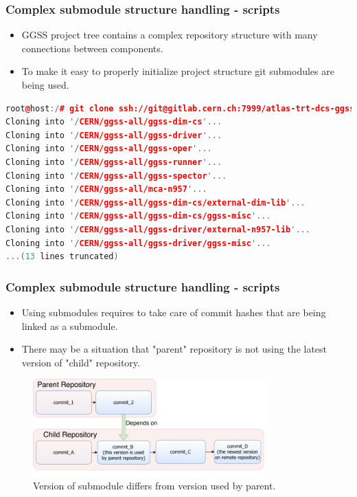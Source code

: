 \documentclass[10pt]{beamer}
\begin{document}
\begin{frame}[fragile]
\frametitle{Complex submodule structure handling - scripts}
\begin{itemize}
\item GGSS project tree contains a complex repository structure with many connections between components.
\item To make it easy to properly initialize project structure git submodules are being used.
\end{itemize}
\begin{lstlisting}[language=c++, caption={Initialize project structure with one command.}]
root@host:/# git clone ssh://git@gitlab.cern.ch:7999/atlas-trt-dcs-ggss/ggss-all.git && cd ggss-all && git submodule update --init --recursive
Cloning into '/CERN/ggss-all/ggss-dim-cs'...
Cloning into '/CERN/ggss-all/ggss-driver'...
Cloning into '/CERN/ggss-all/ggss-oper'...
Cloning into '/CERN/ggss-all/ggss-runner'...
Cloning into '/CERN/ggss-all/ggss-spector'...
Cloning into '/CERN/ggss-all/mca-n957'...
Cloning into '/CERN/ggss-all/ggss-dim-cs/external-dim-lib'...
Cloning into '/CERN/ggss-all/ggss-dim-cs/ggss-misc'...
Cloning into '/CERN/ggss-all/ggss-driver/external-n957-lib'...
Cloning into '/CERN/ggss-all/ggss-driver/ggss-misc'...
...(13 lines truncated)
\end{lstlisting}
\end{frame}

\begin{frame}[fragile]
\frametitle{Complex submodule structure handling - scripts}
\begin{itemize}
\item Using submodules requires to take care of commit hashes that are being linked as a submodule.
\item There may be a situation that "parent" repository is not using the latest version of "child" repository.
\end{itemize}
\begin{figure}
    \centering
    \includegraphics[width=0.8\textwidth]{resources/submodules_problem.pdf}
    \caption{Version of submodule differs from version used by parent.}
\end{figure}
\end{frame}
\end{document}
